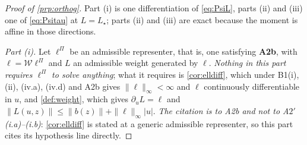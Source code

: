 \begin{proof}[Proof of \cref{prp:orthog}]
Part (i) is one differentiation of \eqref{eq:PsiL}, parts (ii) and (iii) one of \eqref{eq:Psitau} at
$L=L_\star$; parts (ii) and (iii) are exact because the moment is affine in those directions.

\emph{Part (i).}
Let $\ell^\Pi$ be an admissible representer, that is, one satisfying \textbf{A2b}, with
$\ell=\mathcal W\ell^\Pi$ and $L$ an admissible weight
generated by $\ell$. \emph{Nothing in this part requires $\ell^\Pi$ to solve anything}; what it requires
is \cref{cor:elldiff}, which under B1(i), (ii), (iv.a), (iv.d) and A2b gives
$\|\ell\|_\infty<\infty$ and $\ell$ continuously differentiable in $u$, and \cref{def:weight}, which gives
$\partial_uL=\ell$ and $\|L(u,z)\|\le\|b(z)\|+\|\ell\|_\infty|u|$. \emph{The citation is to A2b and not
to A$2'$(i.a)--(i.b)}: \cref{cor:elldiff} is stated
at a generic admissible representer, so this part cites its hypothesis line directly.


\end{proof}
